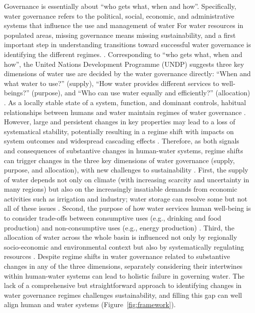 Governance is essentially about ``who gets what, when and how''. Specifically, water governance refers to the political, social, economic, and administrative systems that influence the use and management of water %
For water resources in populated areas, missing governance means missing sustainability, and a first important step in understanding transitions toward successful water governance is identifying the different regimes.
\cite{undpwatergovernancefacilityWaterGovernanceIssue}.
Corresponding to ``who gets what, when and how'', the United Nations Development Programme (UNDP) suggests three key dimensions of water use are decided by the water governance directly: ``When and what water to use?'' (supply), ``How water provides different services to well-beings?'' (purpose), and ``Who can use water equally and efficiently?'' (allocation)
\cite{undpwatergovernancefacilityWaterGovernanceIssue, mariajacobsonUserguideassessing2013, kjellenWatergovernanceperspective2015}.
As a locally stable state of a system, function, and dominant controls, habitual relationships between humans and water maintain regimes of water governance
\cite{carpenterEarlyWarningsRegime2011}.
However, large and persistent changes in key properties may lead to a loss of systematical stability, potentially resulting in a regime shift with impacts on system outcomes and widespread cascading effects
\cite{rochaCascadingregimeshifts2018, gregrCascadingsocialecologicalcosts2020}.
Therefore, as both signals and consequences of substantive changes in human-water systems, regime shifts can trigger changes in the three key dimensions of water governance (supply, purpose, and allocation), with new challenges to sustainability %
\cite{undpwatergovernancefacilityWaterGovernanceIssue, mariajacobsonUserguideassessing2013, kjellenWatergovernanceperspective2015}.
First, the supply of water depends not only on climate (with increasing scarcity and uncertainty in many regions) but also on the increasingly insatiable demands from economic activities such as irrigation and industry; water storage can resolve some but not all of these issues
\cite{greveGlobalassessmentwater2018,wadaHumanwaterinterface2017,qinFlexibilityintensityglobal2019}.
Second, the purpose of how water services human well-being is to consider trade-offs between consumptive uses (e.g., drinking and food production) and non-consumptive uses (e.g., energy production)
\cite{liuWaterscarcityassessments2017,florkeWatercompetitioncities2018,kleemannQuantifyinginterregionalflows2020}.
Third, the allocation of water across the whole basin is influenced not only by regionally socio-economic and environmental context but also by systematically regulating resources
\cite{roobavannanRoleSectoralTransformation2017,speedBasinwaterallocation2013}.
Despite regime shifts in water governance related to substantive changes in any of the three dimensions, separately considering their intertwines within human-water systems can lead to holistic failure in governing water.
The lack of a comprehensive but straightforward approach to identifying changes in water governance regimes challenges sustainability, and filling this gap can well align human and water systems (Figure~\ref{fig:framework}).

